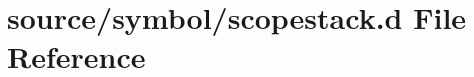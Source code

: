 \hypertarget{scopestack_8d}{
\section{source/symbol/scopestack.d File Reference}
\label{scopestack_8d}
}
